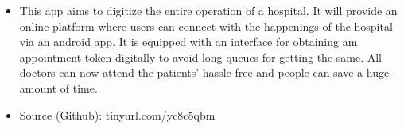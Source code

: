 \begin{itemize}
\item This app aims to digitize the entire operation of a hospital. It will provide an online platform where users can connect with the happenings of the hospital via an android app. It is equipped with an interface for obtaining am appointment token digitally to avoid long queues for getting the same. All doctors can now attend the patients’ hassle-free and people can save a huge amount of time. 
\item Source (Github): tinyurl.com/yc8c5qbm
\end{itemize}




